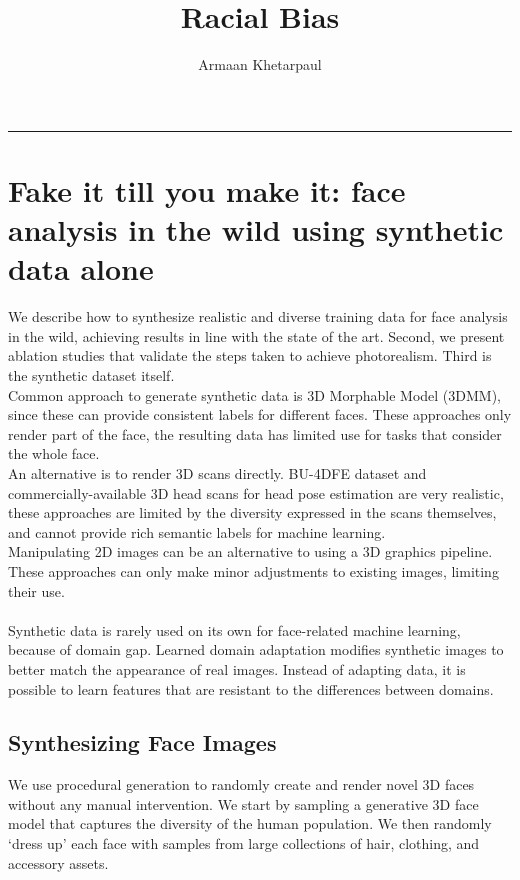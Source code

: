 \documentclass[12pt]{article}
\date{}
\title{\textbf{Racial Bias}}
\author{Armaan Khetarpaul}
\begin{document}
\maketitle
\hrule height 2pt \relax
\section{Fake it till you make it: face analysis in the wild using synthetic data alone}
We describe how to synthesize realistic and diverse training data for face analysis in the wild, achieving results in line with the state of
the art. Second, we present ablation studies that validate the
steps taken to achieve photorealism. Third is the synthetic dataset itself.\\
Common approach to generate synthetic data is 3D Morphable Model
(3DMM), since these can provide consistent labels for
different faces. These approaches only render part of the face, the resulting
data has limited use for tasks that consider the whole face.\\
An alternative is to render 3D scans directly. BU-4DFE dataset and commercially-available 3D head scans for head pose estimation are very realistic, these approaches are limited by
the diversity expressed in the scans themselves, and cannot
provide rich semantic labels for machine learning.\\
Manipulating 2D images can be an alternative to using
a 3D graphics pipeline. These approaches can only make
minor adjustments to existing images, limiting their use.\\
\\
Synthetic data is rarely used on its
own for face-related machine learning, because of domain gap. Learned domain adaptation modifies synthetic images
to better match the appearance of real images. Instead of adapting data, it is possible to learn features
that are resistant to the differences between domains.\\
\subsection{Synthesizing Face Images}
We use procedural
generation to randomly create and render novel 3D faces
without any manual intervention. We start by sampling a generative 3D face model that
captures the diversity of the human population. We then randomly `dress up' each face with samples from large collections of hair, clothing, and accessory assets. 
\end{document}

